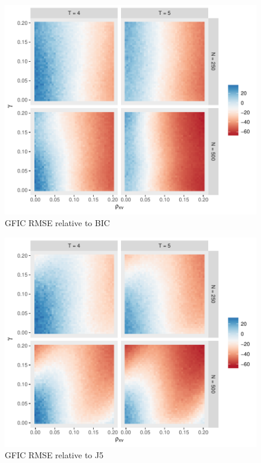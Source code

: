 \begin{figure}
\centering
\includegraphics[scale = 0.8]{./simulations/DynamicPanel/results/Dpanel_GFIC_RMSE_rel_BIC}
\caption{GFIC RMSE relative to BIC}
\end{figure}
\begin{figure}
\centering
\includegraphics[scale = 0.8]{./simulations/DynamicPanel/results/Dpanel_GFIC_RMSE_rel_J5}
\caption{GFIC RMSE relative to J5}
\end{figure}
